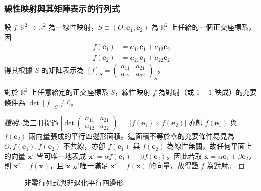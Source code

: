 \subsubsection*{線性映射與其矩陣表示的行列式}

設 $f: \mathbb{R}^2 \to \mathbb{R}^2$ 為一線性映射，$S \equiv (O; \mathbf{e}_1, \mathbf{e}_2)$ 為 $\mathbb{R}^2$ 上任給的一個正交座標系，因
\begin{align*}
f(\mathbf{e}_1) &= a_{11}\mathbf{e}_1 + a_{12}\mathbf{e}_2 \\
f(\mathbf{e}_2) &= a_{21}\mathbf{e}_1 + a_{22}\mathbf{e}_2
\end{align*}
得其根據 $S$ 的矩陣表示為 $[f]_S = \begin{pmatrix} a_{11} & a_{21} \\ a_{12} & a_{22} \end{pmatrix}_S$。

\begin{theorem}[定理 5]
對於 $\mathbb{R}^2$ 上任意給定的正交座標系 $S$，線性映射 $f$ 為對射（或 $1-1$ 映成）的充要條件為 $\det[f]_S \neq 0$。
\end{theorem}

\begin{proof}[證明]
第三冊提過 $\left|\det \begin{pmatrix} a_{11} & a_{21} \\ a_{12} & a_{22} \end{pmatrix}\right| = |f(\mathbf{e}_1) \times f(\mathbf{e}_2)|$ 亦卽 $f(\mathbf{e}_1)$ 與 $f(\mathbf{e}_2)$ 兩向量張成的平行四邊形面積。這面積不等於零的充要條件易見為 $O, f(\mathbf{e}_1), f(\mathbf{e}_2)$ 不共線，亦卽 $f(\mathbf{e}_1)$ 與 $f(\mathbf{e}_2)$ 為線性無關，故任何平面上的向量 $\mathbf{x}'$ 皆可唯一地表成 $\mathbf{x}' = \alpha f(\mathbf{e}_1) + \beta f(\mathbf{e}_2)$。因此若取 $\mathbf{x} = \alpha\mathbf{e}_1 + \beta\mathbf{e}_2$，則 $\mathbf{x}' = f(\mathbf{x})$，且 $\mathbf{x}$ 是唯一滿足 $\mathbf{x}' = f(\mathbf{x})$ 的向量，故得證 $f$ 為對射。
\end{proof}

\begin{figure}[H]
\centering
{}
\caption{非零行列式與非退化平行四邊形}
\label{fig:b4-1-3-9}
\end{figure}

